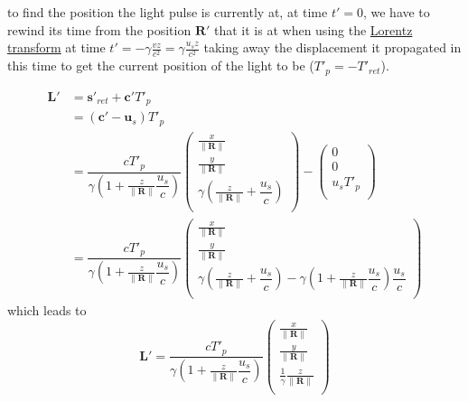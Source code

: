 to find the position the light pulse is currently at, at time $t'=0$, we have to rewind its time from the position $\mathbf{R}'$ that it is at when using the \hyperlink{def-lorentz-transform}{Lorentz transform} at time $t'= -{\gamma}\frac{vz}{c^2}= {\gamma}\frac{u_s z}{c^2}$ taking away the displacement it propagated in this time to get the current position of the light to be ($T'_{p}=- T'_{ret}$).

\begin{equation}
	\begin{split}
		\mathbf{L}'
		 & = \mathbf{s}'_{ret} + \mathbf{c}'T'_{p}
		\\
		 & = \left( \mathbf{c}' - \mathbf{u}_s \right)T'_{p}
		\\
		 & = \dfrac{c T'_{p}}{{\gamma}\left(1 + \frac{z}{\|\mathbf{R}\|} \dfrac{u_s}{c} \right)}
		\begin{pmatrix}
			\frac{x}{\|\mathbf{R}\|}                                          \\
			\frac{y}{\|\mathbf{R}\|}                                          \\
			{\gamma} \left( \frac{z}{\|\mathbf{R}\|} + \dfrac{u_s}{c} \right) \\
		\end{pmatrix}
		-
		\begin{pmatrix}
			0          \\
			0          \\
			u_s T'_{p} \\
		\end{pmatrix}
		\\
		 & = \dfrac{c T'_{p}}{{\gamma}\left(1 + \frac{z}{\|\mathbf{R}\|} \dfrac{u_s}{c} \right)}
		\begin{pmatrix}
			\frac{x}{\|\mathbf{R}\|}                                                                                                                             \\
			\frac{y}{\|\mathbf{R}\|}                                                                                                                             \\
			{\gamma} \left( \frac{z}{\|\mathbf{R}\|} + \dfrac{u_s}{c} \right) - {\gamma}\left(1 + \frac{z}{\|\mathbf{R}\|} \dfrac{u_s}{c} \right) \dfrac{u_s}{c} \\
		\end{pmatrix}
	\end{split}
\end{equation}
which leads to
\begin{equation}
	\mathbf{L}' = \dfrac{c T'_{p}}{{\gamma}\left(1 + \frac{z}{\|\mathbf{R}\|} \dfrac{u_s}{c} \right)}
	\begin{pmatrix}
		\frac{x}{\|\mathbf{R}\|}                    \\
		\frac{y}{\|\mathbf{R}\|}                    \\
		\frac{1}{{\gamma}} \frac{z}{\|\mathbf{R}\|} \\
	\end{pmatrix}
\end{equation}
